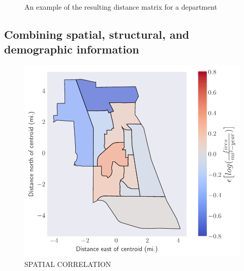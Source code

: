 \documentclass{svjour3}
\begin{document}
    \begin{figure}[!htb]
       \begin{center}
      \end{center}
      \caption{An example of the resulting distance matrix for a department}
     \label{fig:pca}
  \end{figure}
  
  
  
  
  
  
  
  
  \subsection{Combining spatial, structural, and demographic information}
  
  
  
\begin{figure}[htb] \centering
\includegraphics[width=.75\textwidth]{figures/spatial_correlation.pdf}
\caption{SPATIAL CORRELATION}
\label{fig:spatialcorr}
\end{figure}
\end{document}
